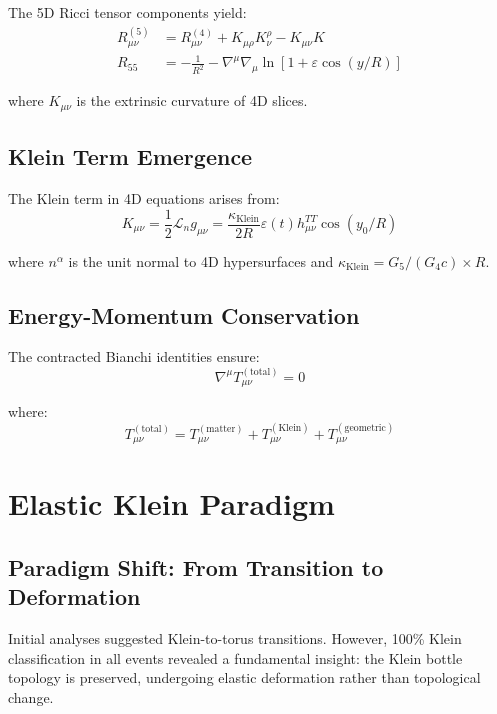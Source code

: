 \documentclass[12pt]{iopart}
\begin{document}
The 5D Ricci tensor components yield:
\begin{align}
R_{\mu\nu}^{(5)} &= R_{\mu\nu}^{(4)} + K_{\mu\rho}K^\rho_\nu - K_{\mu\nu}K\\
R_{55} &= -\frac{1}{R^2} - \nabla^\mu\nabla_\mu\ln[1 + \varepsilon\cos(y/R)]
\end{align}

where $K_{\mu\nu}$ is the extrinsic curvature of 4D slices.

\subsection{Klein Term Emergence}

The Klein term in 4D equations arises from:
\begin{equation}
K_{\mu\nu} = \frac{1}{2}\mathcal{L}_n g_{\mu\nu} = \frac{\kappa_{\text{Klein}}}{2R}\varepsilon(t) h_{\mu\nu}^{TT}\cos(y_0/R)
\end{equation}

where $n^\alpha$ is the unit normal to 4D hypersurfaces and $\kappa_{\text{Klein}} = G_5/(G_4 c) \times R$.

\subsection{Energy-Momentum Conservation}

The contracted Bianchi identities ensure:
\begin{equation}
\nabla^\mu T_{\mu\nu}^{(\text{total})} = 0
\end{equation}

where:
\begin{equation}
T_{\mu\nu}^{(\text{total})} = T_{\mu\nu}^{(\text{matter})} + T_{\mu\nu}^{(\text{Klein})} + T_{\mu\nu}^{(\text{geometric})}
\end{equation}

\section{Elastic Klein Paradigm}
\label{app:elastic_paradigm}

\subsection{Paradigm Shift: From Transition to Deformation}

Initial analyses suggested Klein-to-torus transitions. However, 100\% Klein classification in all events revealed a fundamental insight: the Klein bottle topology is preserved, undergoing elastic deformation rather than topological change.
\end{document}
